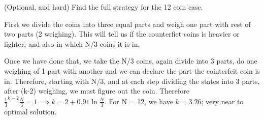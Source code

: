 \documentclass[10pt,answers]{exam}
\begin{document}
\begin{questions}
\begin{parts}
\begin{solution}
    \end{solution}

    \bonuspart[15] (Optional, and hard) Find the full strategy for the 12 coin case.
    \begin{solution}
        First we divide the coins into three equal parts and weigh one part with
        rest of two parts (2 weighing). This will tell us if the counterfiet
        coins is heavier or lighter; and also in which N/3 coins it is in.

        Once we have done that, we take the N/3 coins, again divide into 3
        parts, do one weighing of 1 part with another and we can declare the
        part the cointerfeit coin is in. Therefore, starting with N/3, and at
        each step dividing the states into 3 parts, after (k-2) weighing, we
        must figure out the coin. Therefore
        \(\frac{1}{3}^{k-2} \frac{N}{3} = 1 \implies k = 2 + 0.91 \ln \frac{N}{3}\).
        For N = 12, we have \(k = 3.26\); very near to optimal solution.

    \end{solution}

\end{parts}



\end{questions}
\end{document}
